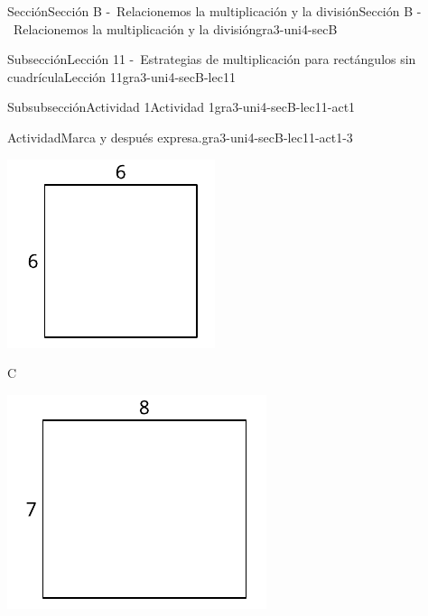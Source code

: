 \documentclass[twoside,10pt,]{article}
\begin{document}
\begin{sectionptx}{Sección}{Sección B -~Relacionemos la multiplicación y la división}{}{Sección B -~Relacionemos la multiplicación y la división}{}{}{gra3-uni4-secB}
\begin{subsectionptx}{Subsección}{Lección 11 -~Estrategias de multiplicación para rectángulos sin cuadrícula}{}{Lección 11}{}{}{gra3-uni4-secB-lec11}
\begin{subsubsectionptx}{Subsubsección}{Actividad 1}{}{Actividad 1}{}{}{gra3-uni4-secB-lec11-act1}
\begin{activity}{Actividad}{Marca y después expresa.}{gra3-uni4-secB-lec11-act1-3}
\begin{sidebyside}{3}{0}{0}{0}
\begin{sbspanel}{0.261}
\includegraphics[width=\linewidth]{external/svg-source/tikz-file-153085.pdf}
\end{sbspanel}%
\begin{sbspanel}{0.348}%
C%
\par
\includegraphics[width=\linewidth]{external/svg-source/tikz-file-153086.pdf}
\end{sbspanel}%
\end{sidebyside}%
\end{activity}%

\end{subsubsectionptx}
\end{subsectionptx}
\end{sectionptx}
\end{document}
